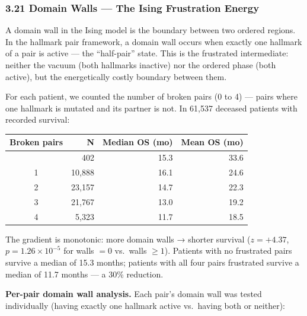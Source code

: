 \documentclass[
  11pt,
]{article}
\newcounter{none} %
\begin{document}
\subsubsection{3.21 Domain Walls --- The Ising Frustration
Energy}\label{domain-walls-the-ising-frustration-energy}

A domain wall in the Ising model is the boundary between two ordered
regions. In the hallmark pair framework, a domain wall occurs when
exactly one hallmark of a pair is active --- the ``half-pair'' state.
This is the frustrated intermediate: neither the vacuum (both hallmarks
inactive) nor the ordered phase (both active), but the energetically
costly boundary between them.

For each patient, we counted the number of broken pairs (0 to 4) ---
pairs where one hallmark is mutated and its partner is not. In 61,537
deceased patients with recorded survival:

{\def\LTcaptype{none} %
\begin{longtable}[]{@{}crrr@{}}
\toprule\noalign{}
Broken pairs & N & Median OS (mo) & Mean OS (mo) \\
\midrule\noalign{}
\endhead
\bottomrule\noalign{}
\endlastfoot
0 & 402 & 15.3 & 33.6 \\
1 & 10,888 & 16.1 & 24.6 \\
2 & 23,157 & 14.7 & 22.3 \\
3 & 21,767 & 13.0 & 19.2 \\
4 & 5,323 & 11.7 & 18.5 \\
\end{longtable}
}

The gradient is monotonic: more domain walls → shorter survival
(\(z = +4.37\), \(p = 1.26 \times 10^{-5}\) for walls \(= 0\) vs.~walls
\(\geq 1\)). Patients with no frustrated pairs survive a median of 15.3
months; patients with all four pairs frustrated survive a median of 11.7
months --- a 30\% reduction.

\textbf{Per-pair domain wall analysis.} Each pair's domain wall was
tested individually (having exactly one hallmark active vs.~having both
or neither):
\end{document}
